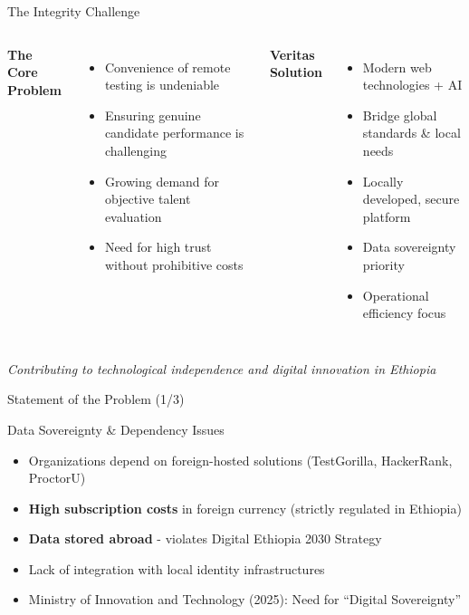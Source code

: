 \begin{frame}{The Integrity Challenge}
    \begin{columns}
        \textbf{The Core Problem}
        \begin{itemize}
            \item Convenience of remote testing is undeniable
            \item Ensuring genuine candidate performance is challenging
            \item Growing demand for objective talent evaluation
            \item Need for high trust without prohibitive costs
        \end{itemize}
        
        \textbf{Veritas Solution}
        \begin{itemize}
            \item Modern web technologies + AI
            \item Bridge global standards \& local needs
            \item Locally developed, secure platform
            \item Data sovereignty priority
            \item Operational efficiency focus
        \end{itemize}
    \end{columns}
    
    \vspace{0.5cm}
    \begin{center}
        \textit{Contributing to technological independence and digital innovation in Ethiopia}
    \end{center}
\end{frame}

\begin{frame}{Statement of the Problem (1/3)}
    \begin{alertblock}{Data Sovereignty \& Dependency Issues}
        \begin{itemize}
            \item Organizations depend on foreign-hosted solutions (TestGorilla, HackerRank, ProctorU)
            \item \textbf{High subscription costs} in foreign currency (strictly regulated in Ethiopia)
            \item \textbf{Data stored abroad} - violates Digital Ethiopia 2030 Strategy
            \item Lack of integration with local identity infrastructures
            \item Ministry of Innovation and Technology (2025): Need for ``Digital Sovereignty''
        \end{itemize}
    \end{alertblock}
\end{frame}

